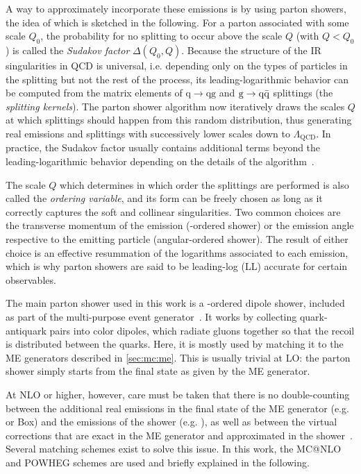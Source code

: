 A way to approximately incorporate these emissions is by using parton showers, the idea of which is sketched in the following. %
For a parton associated with some scale $Q_0$, the probability for no splitting to occur above the scale $Q$ (with $Q < Q_0$) is called the \textit{Sudakov factor} $\Delta(Q_0,Q)$. Because the structure of the IR singularities in QCD is universal, i.e. depending only on the types of particles in the splitting but not the rest of the process, its leading-logarithmic behavior can be computed from the matrix elements of $\mathrm{q \rightarrow qg}$ and $\mathrm{g \rightarrow \mathrm{q \bar{q}}}$ splittings (the \textit{splitting kernels}).
The parton shower algorithm now iteratively draws the scales $Q$ at which splittings should happen from this random distribution, thus generating real emissions and splittings with successively lower scales down to $\Lambda_{\mathrm{QCD}}$. In practice, the Sudakov factor usually contains additional terms beyond the leading-logarithmic behavior depending on the details of the algorithm~\cite{Skands:2012ts}.

The scale $Q$ which determines in which order the splittings are performed is also called the \textit{ordering variable}, and its form can be freely chosen as long as it correctly captures the soft and collinear singularities. Two common choices are the transverse momentum of the emission (\pt-ordered shower) or the emission angle respective to the emitting particle (angular-ordered shower). The result of either choice is an effective resummation of the logarithms associated to each emission, which is why parton showers are said to be leading-log (LL) accurate for certain observables.

The main parton shower used in this work is a \pt-ordered dipole shower, included as part of the \pythia multi-purpose event generator~\cite{Pythia:2015,Pythia:2022}. It works by collecting quark-antiquark pairs into color dipoles, which radiate gluons together so that the recoil is distributed between the quarks. Here, it is mostly used by matching it to the ME generators described in \cref{sec:mc:me}. This is usually trivial at LO: the parton shower simply starts from the final state as given by the ME generator.

At NLO or higher, however, care must be taken that there is no double-counting between the additional real emissions in the final state of the ME generator (e.g. \amcatnlo or \powheg Box) and the emissions of the shower (e.g. \pythia), as well as between the virtual corrections that are exact in the ME generator and approximated in the shower~\cite{Skands:2012ts}. Several matching schemes exist to solve this issue. In this work, the MC@NLO and POWHEG schemes are used and briefly explained in the following.


